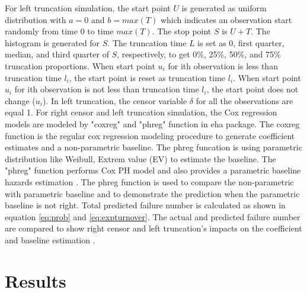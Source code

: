 \documentclass[12pt,letterpaper]{article}
\begin{document}
 For left truncation simulation, the start point $U$ is generated as uniform distribution with $a=0$ and $b=max(T)$ which indicates an observation start randomly from time 0 to time $max(T)$. The stop point $S$ is $U+T$. The histogram is generated for $S$. The truncation time $L$ is set as 0, first quarter, median, and third quarter of $S$, respectively, to get 0\%, 25\%, 50\%, and 75\% truncation proportions. When start point $u_i$ for ith observation is less than truncation time $l_i$, the start point is reset as truncation time $l_i$. When start point $u_i$ for ith observation is not less than truncation time $l_i$, the start point does not change ($u_i$). In left truncation, the censor variable $\delta$ for all the observations are equal 1. For right censor and left truncation simulation,  the Cox regression models are modeled by "coxreg" and "phreg" function in eha package. The coxreg function is the regular cox regression modeling procedure to generate coefficient estimates and a non-parametric baseline.  The phreg funcation is using parametric distribution like Weibull, Extrem value (EV) to estimate the baseline. The "phreg" function performs Cox PH model and also provides a parametric baseline hazards estimation \citep{brostrom2012}. The phreg function is used to compare the non-parametric with parametric baseline and to demonstrate the prediction when the parametric baseline is not right.
 Total predicted failure number is calculated as shown in equation \ref{eq:prob} and \ref {eq:expturnover}. The actual and predicted failure number are compared to show right censor and left truncation's impacts on the coefficient and baseline estimation .

\section{Results}
\end{document}
